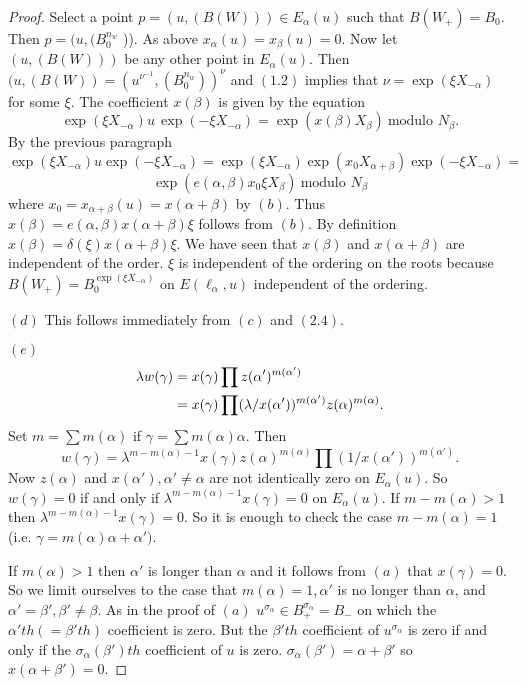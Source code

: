\documentclass{memo-l}
\theoremstyle{definition}
\theoremstyle{remark}
\numberwithin{section}{chapter}
\numberwithin{equation}{chapter}
\begin{document}
\begin{proof}
   Select a point $p = (u,(B(W)))  \in  E_{{\alpha}}(u)$ such that
$B(W_{+}) = B_{0}$.  Then $p = (u,(B_{0}^{n_{w}}$ )).  As above
$x_{{\alpha}}(u) = x_{{\beta}}(u) = 0$.  Now let $(u,(B(W)))$ be any other
point in $E_{{\alpha}}(u)$.  Then $(u,(B(W)) = (u^{{\nu}^{-1}},
(B_{0}^{n_{w}}))^{{\nu}}$ and $(1.2)$ implies that ${\nu} =
\exp({\xi}X_{-{\alpha}})$ for some ${\xi}$.  The coefficient $x({\beta})$ is
given by the equation
$$
\exp({\xi}X_{-{\alpha}})u\,\exp(-{\xi}X_{-{\alpha}}) =
\exp(x({\beta})X_{{\beta}})\ {\text{modulo\ }} N_{{\beta}}.
$$
By the previous paragraph
$$
\exp({\xi}X_{-{\alpha}})u\exp(-{\xi}X_{-{\alpha}}) =
\exp({\xi}X_{-{\alpha}})\exp(x_{0}X_{{\alpha}+{\beta}})\exp(-{\xi}X_{-{\alpha}})
=
$$
$$
\exp(e({\alpha},{\beta})x_{0}{\xi}X_{{\beta}})\ {\text{modulo\ }} N_{{\beta}}
$$
where $x_{0} = x_{{\alpha}+{\beta}}(u) = x({\alpha}+{\beta})$ by $(b)$.
Thus $x({\beta}) = e({\alpha},{\beta})x({\alpha}+{\beta}){\xi}$ follows
from $(b)$.  By definition $x({\beta}) =
{\delta}({\xi})x({\alpha}+{\beta}){\xi}$.  We have seen that $x({\beta})$
and $x({\alpha}+{\beta})$ are independent of the order.  ${\xi}$ is
independent of the ordering on the roots because
$B(W_{+}) = B_{0}^{\exp({\xi}X_{-{\alpha}})}$ on $E({\ell}_{{\alpha}},u)$
independent of the ordering.


   $(d)$ This follows immediately from $(c)$ and $(2.4)$.

   $(e)$
$$
\aligned
{\lambda}w({\gamma}) &= x({\gamma}) \prod z({\alpha}')^{m({\alpha}')} \\
&= x({\gamma}) \prod
({\lambda}/x({\alpha}'))^{m({\alpha}')}z({\alpha})^{m({\alpha})} .
\endaligned
$$
Set $m = \sum m({\alpha})$ if ${\gamma} = \sum m({\alpha}){\alpha}$.
Then
$$
w({\gamma}) = {\lambda}^{m-m({\alpha})-1}
x({\gamma})z({\alpha})^{m({\alpha})} \prod
(1/x({\alpha}'))^{m({\alpha}')} .
$$
Now $z({\alpha})$ and $x({\alpha}'), {\alpha}' \ne {\alpha}$ are not
identically zero on $E_{{\alpha}}(u)$.  So $w({\gamma}) = 0$ if and only if
${\lambda}^{m-m({\alpha})-1} x({\gamma}) = 0$ on $E_{{\alpha}}(u)$.  If
$m-m({\alpha}) > 1$ then ${\lambda}^{m-m({\alpha})-1} x({\gamma}) = 0$.
So it is enough to check the case $m-m({\alpha}) =1$ (i.e.
${\gamma} = m({\alpha}){\alpha}+{\alpha}')$.

   If $m({\alpha}) > 1$ then ${\alpha}'$ is longer than ${\alpha}$ and it
follows from $(a)$ that $x({\gamma}) = 0$.  So we limit ourselves to the case
that $m({\alpha}) = 1, {\alpha}'$ is no longer than ${\alpha}$, and
${\alpha}' = {\beta}',{\beta}' \ne {\beta}$.  As in the proof of
$(a)$ $u^{{\sigma}_{{\alpha}}}  \in  B_{+}^{{\sigma}_{{\alpha}}}  =  B_{-}$
on which the ${\alpha}'th ( = {\beta}'th)$ coefficient is zero.  But the
${\beta}'th$ coefficient of $u^{{\sigma}_{{\alpha}}}$ is zero if and
only if the ${\sigma}_{{\alpha}}({\beta}')th$ coefficient of $u$ is zero.
${\sigma}_{{\alpha}}({\beta}') = {\alpha}+{\beta}'$ so
$x({\alpha}+{\beta}') = 0$.


\end{proof}
\end{document}
